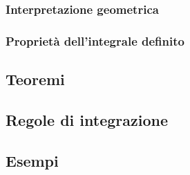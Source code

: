 \documentclass[letterpaper,10pt,italian]{jupyterBook}
\begin{document}
\subsubsection{Interpretazione geometrica}
\label{\detokenize{ch/multivariable-calculus/integrals:interpretazione-geometrica}}

\subsubsection{Proprietà dell’integrale definito}
\label{\detokenize{ch/multivariable-calculus/integrals:proprieta-dell-integrale-definito}}

\subsection{Teoremi}
\label{\detokenize{ch/multivariable-calculus/integrals:teoremi}}

\subsection{Regole di integrazione}
\label{\detokenize{ch/multivariable-calculus/integrals:regole-di-integrazione}}

\subsection{Esempi}
\label{\detokenize{ch/multivariable-calculus/integrals:esempi}}
\sphinxstepscope
\end{document}

